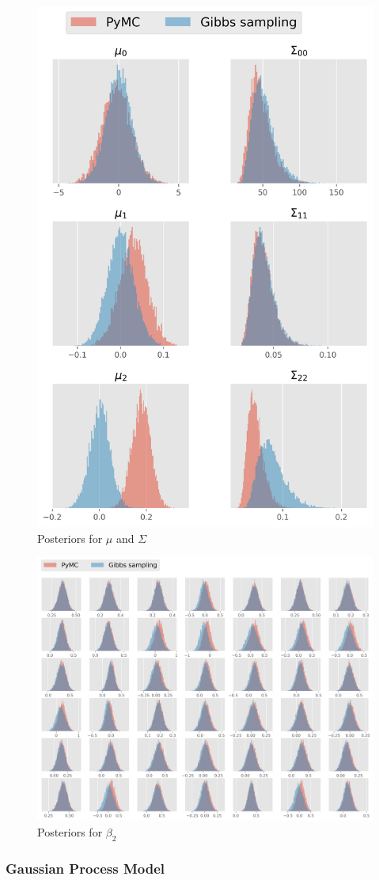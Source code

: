 \documentclass[paper=a4, fontsize=11pt]{scrartcl}
\begin{document}
\begin{figure}[!htb]\label{pymc1}
\centering
\includegraphics[width=.4\textwidth]{project/writeup/compare_gibbs_pymc1.png}
\caption{Posteriors for $\mu$ and $\Sigma$}
\end{figure}


\begin{figure}[!htb]\label{pymc2}
\centering
\includegraphics[width=1\textwidth]{project/writeup/compare_gibbs_pymc2.png}
\caption{Posteriors for $\beta_2$}
\end{figure}



\subsubsection{Gaussian Process Model}
\end{document}
